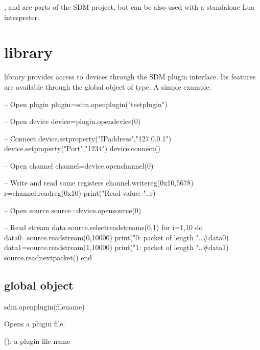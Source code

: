 \documentclass[a4paper,12pt,twoside,extrafontsizes]{memoir}
\begin{document}
,  and  are parts of the SDM project, but can be also used with a standalone Lua interpreter.

\section[sdm library]{ library}

 library provides access to devices through the SDM plugin interface. Its features are available through the  global object of  type. A simple example:

\begin{breakshellcmds}\begin{luacode}
-- Open plugin
plugin=sdm.openplugin("testplugin")

-- Open device
device=plugin.opendevice(0)

-- Connect
device.setproperty("IPaddress","127.0.0.1")
device.setproperty("Port","1234")
device.connect()

-- Open channel
channel=device.openchannel(0)

-- Write and read some registers
channel.writereg(0x10,5678)
r=channel.readreg(0x10)
print("Read value: "..r)

-- Open source
source=device.opensource(0)

-- Read stream data
source.selectreadstreams({0,1})
for i=1,10 do
    data0=source.readstream(0,10000)
    print("0: packet of length "..#data0)
    data1=source.readstream(1,10000)
    print("1: packet of length "..#data1)
    source.readnextpacket()
end
\end{luacode}\end{breakshellcmds}

\subsection{ global object}


\begin{luafuncprototype}
sdm.openplugin(filename)
\end{luafuncprototype}

\begin{funcdescr}
	Opens a plugin file.
\end{funcdescr}

\begin{funcparams}
	 (): a plugin file name
\end{funcparams}
\end{document}
